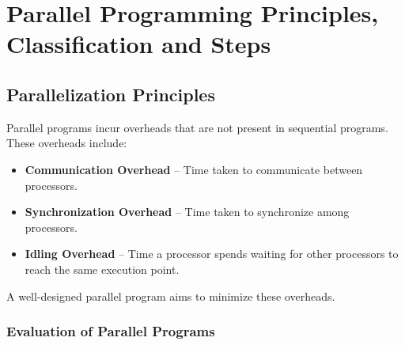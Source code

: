\documentclass[12pt]{book}
\begin{document}
\chapter{Parallel Programming Principles, Classification and Steps}
\section{Parallelization Principles}
Parallel programs incur overheads that are not present in sequential programs. These overheads include:
\begin{itemize}
    \item \textbf{Communication Overhead} – Time taken to communicate between processors.
    \item \textbf{Synchronization Overhead} – Time taken to synchronize among processors.
    \item \textbf{Idling Overhead} – Time a processor spends waiting for other processors to reach the same execution point.
\end{itemize}
A well-designed parallel program aims to minimize these overheads.

\subsection{Evaluation of Parallel Programs}
\end{document}

